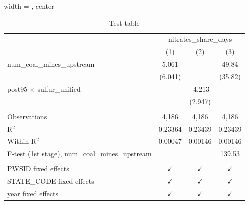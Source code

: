 
\begin{table}[htbp]
   
   \caption{\label{test} Test table}
   \bigskip
   
   \centering
   
   \begin{adjustbox}{width = \textwidth, center}
      
      
      \begin{tabular}{lccc}
         \toprule
         
          & \multicolumn{3}{c}{nitrates\_share\_days}\\
         
                                                           & (1)           & (2)           & (3)\\  
         
         \midrule 
         num\_coal\_mines\_upstream                        & 5.061         &               & 49.84\\   
                                                           & (6.041)       &               & (35.82)\\   
         post95 $\times$ sulfur\_unified                   &               & -4.213        &   \\   
                                                           &               & (2.947)       &   \\   
         
          \\
         
         Observations                                      & 4,186         & 4,186         & 4,186\\  
         R$^2$                                             & 0.23364       & 0.23439       & 0.23439\\  
         Within R$^2$                                      & 0.00047       & 0.00146       & 0.00146\\  
         F-test (1st stage), num\_coal\_mines\_upstream    &               &               & 139.53\\  
         
          \\
         
         PWSID fixed effects                               & $\checkmark$  & $\checkmark$  & $\checkmark$\\   
         STATE\_CODE fixed effects                         & $\checkmark$  & $\checkmark$  & $\checkmark$\\   
         year fixed effects                                & $\checkmark$  & $\checkmark$  & $\checkmark$\\   
         

\end{tabular}
\end{adjustbox}
\end{table}
